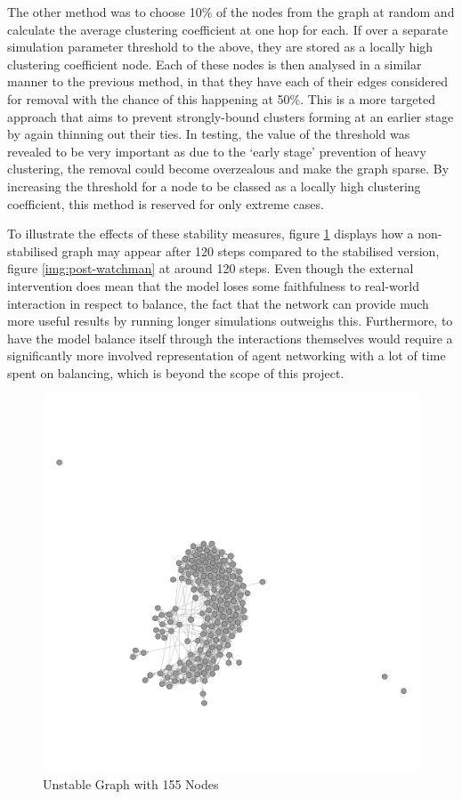 \documentclass[]{report}
\begin{document}
The other method was to choose 10\% of the nodes from the graph at random and calculate the average clustering coefficient at one hop for each. If over a separate simulation parameter threshold to the above, they are stored as a locally high clustering coefficient node. Each of these nodes is then analysed in a similar manner to the previous method, in that they have each of their edges considered for removal with the chance of this happening at 50\%. This is a more targeted approach that aims to prevent strongly-bound clusters forming at an earlier stage by again thinning out their ties. In testing, the value of the threshold was revealed to be very important as due to the `early stage' prevention of heavy clustering, the removal could become overzealous and make the graph sparse. By increasing the threshold for a node to be classed as a locally high clustering coefficient, this method is reserved for only extreme cases.

To illustrate the effects of these stability measures, figure \ref{img:pre-watchman} displays how a non-stabilised graph may appear after 120 steps compared to the stabilised version, figure \ref{img:post-watchman} at around 120 steps. Even though the external intervention does mean that the model loses some faithfulness to real-world interaction in respect to balance, the fact that the network can provide much more useful results by running longer simulations outweighs this. Furthermore, to have the model balance itself through the interactions themselves would require a significantly more involved representation of agent networking with a lot of time spent on balancing, which is beyond the scope of this project.

\begin{figure}
\begin{center}
\includegraphics[scale=0.4]{pre-balance.png}
\end{center}
\caption{Unstable Graph with 155 Nodes}
\label{img:pre-watchman}
\end{figure}
\end{document}
